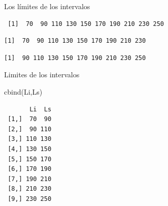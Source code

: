 \documentclass[
  ignorenonframetext,
  aspectratio=169,
  spanish,
]{beamer}
\newenvironment{Shaded}{\begin{snugshade}}{\end{snugshade}}
\newcommand{\DecValTok}[1]{\textcolor[rgb]{0.68,0.00,0.00}{#1}}
\newcommand{\FunctionTok}[1]{\textcolor[rgb]{0.28,0.35,0.67}{#1}}
\newcommand{\NormalTok}[1]{\textcolor[rgb]{0.00,0.23,0.31}{#1}}
\newcommand{\OtherTok}[1]{\textcolor[rgb]{0.00,0.23,0.31}{#1}}
\newcommand{\SpecialCharTok}[1]{\textcolor[rgb]{0.37,0.37,0.37}{#1}}
\begin{document}
\begin{frame}[fragile]{Los límites de los intervalos}
\label{los-luxedmites-de-los-intervalos}
\begin{Shaded}
\end{Shaded}

\begin{verbatim}
 [1]  70  90 110 130 150 170 190 210 230 250
\end{verbatim}

\begin{Shaded}
\end{Shaded}

\begin{verbatim}
[1]  70  90 110 130 150 170 190 210 230
\end{verbatim}

\begin{Shaded}
\end{Shaded}

\begin{verbatim}
[1]  90 110 130 150 170 190 210 230 250
\end{verbatim}
\end{frame}

\begin{frame}[fragile]{Limites de los intervalos}
\label{limites-de-los-intervalos}
\begin{Shaded}
\begin{Highlighting}[]
\FunctionTok{cbind}\NormalTok{(Li,Ls)}
\end{Highlighting}
\end{Shaded}

\begin{verbatim}
       Li  Ls
 [1,]  70  90
 [2,]  90 110
 [3,] 110 130
 [4,] 130 150
 [5,] 150 170
 [6,] 170 190
 [7,] 190 210
 [8,] 210 230
 [9,] 230 250
\end{verbatim}
\end{frame}
\end{document}
